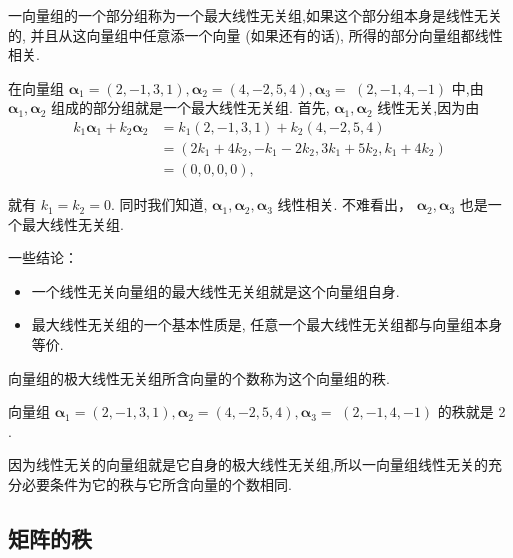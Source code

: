 \begin{definition}[最大线性无关组]
    一向量组的一个部分组称为一个最大线性无关组,如果这个部分组本身是线性无关的, 并且从这向量组中任意添一个向量 (如果还有的话), 所得的部分向量组都线性相关.
\end{definition}

\begin{exercise}
    在向量组 $\boldsymbol{\alpha}_1=(2,-1,3,1), \boldsymbol{\alpha}_2=(4,-2,5,4), \boldsymbol{\alpha}_3=$ $(2,-1,4,-1)$ 中,由 $\boldsymbol{\alpha}_1, \boldsymbol{\alpha}_2$ 组成的部分组就是一个最大线性无关组. 首先, $\boldsymbol{\alpha}_1, \boldsymbol{\alpha}_2$ 线性无关,因为由
$$
\begin{aligned}
k_1 \boldsymbol{\alpha}_1+k_2 \boldsymbol{\alpha}_2 & =k_1(2,-1,3,1)+k_2(4,-2,5,4) \\
& =\left(2 k_1+4 k_2,-k_1-2 k_2, 3 k_1+5 k_2, k_1+4 k_2\right) \\
& =(0,0,0,0),
\end{aligned}
$$

就有 $k_1=k_2=0$. 同时我们知道, $\boldsymbol{\alpha}_1, \boldsymbol{\alpha}_2, \boldsymbol{\alpha}_3$ 线性相关. 不难看出， $\boldsymbol{\alpha}_2, \boldsymbol{\alpha}_3$ 也是一个最大线性无关组.
\end{exercise}

一些结论：
\begin{itemize}
    \item 一个线性无关向量组的最大线性无关组就是这个向量组自身.
    \item 最大线性无关组的一个基本性质是, 任意一个最大线性无关组都与向量组本身等价.
\end{itemize}

\begin{definition}
    向量组的极大线性无关组所含向量的个数称为这个向量组的秩.
\end{definition}

\begin{exercise}
    向量组 $\boldsymbol{\alpha}_1=(2,-1,3,1), \boldsymbol{\alpha}_2=(4,-2,5,4), \boldsymbol{\alpha}_3=$ $(2,-1,4,-1)$ 的秩就是 2 .
\end{exercise}

因为线性无关的向量组就是它自身的极大线性无关组,所以一向量组线性无关的充分必要条件为它的秩与它所含向量的个数相同.

\subsection{矩阵的秩}
\label{subsec:矩阵的秩}                                                

